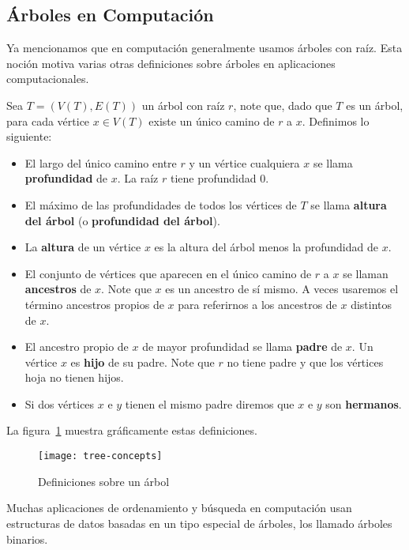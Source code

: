 \subsection{Árboles en Computación}

Ya mencionamos que en computación generalmente usamos árboles con raíz.
Esta noción motiva varias otras definiciones sobre árboles en aplicaciones computacionales.

\begin{definicion}
Sea $T=(V(T),E(T))$ un árbol con raíz $r$, note que, dado que $T$ es un árbol, para cada vértice $x\in V(T)$ existe un único camino de $r$ a $x$.
Definimos lo siguiente:
\begin{itemize}
  \itemsep 0pt
  \item El largo del único camino entre $r$ y un vértice cualquiera $x$ se llama {\bf profundidad} de $x$.
  La raíz $r$ tiene profundidad $0$.
  \item El máximo de las profundidades de todos los vértices de $T$ se llama {\bf altura del árbol} (o {\bf profundidad del árbol}).
  \item La {\bf altura} de un vértice $x$ es la altura del árbol menos la profundidad de $x$.
  \item El conjunto de vértices que aparecen en el único camino de $r$ a $x$ se llaman {\bf ancestros} de $x$.
  Note que $x$ es un ancestro de sí mismo.
  A veces usaremos el término ancestros propios de $x$  para referirnos a los ancestros de $x$ distintos de $x$.
  \item El ancestro propio de $x$ de mayor profundidad se llama {\bf padre} de $x$. 
  Un vértice $x$ es {\bf hijo} de su padre.
  Note que $r$ no tiene padre y que los vértices hoja no tienen hijos.
  \item Si dos vértices $x$ e $y$ tienen el mismo padre diremos que $x$ e $y$ son {\bf hermanos}.
\end{itemize}
La figura~\ref{fig:tree-concepts} muestra gráficamente estas definiciones.

\begin{figure}[h!]
\centering
\texttt{[image: tree-concepts]}
\caption{Definiciones sobre un árbol}
\label{fig:tree-concepts}
\end{figure}
\end{definicion}

Muchas aplicaciones de ordenamiento y búsqueda en computación usan estructuras de datos basadas en un tipo especial de árboles, los llamado árboles binarios.


